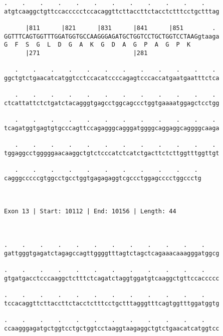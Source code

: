 \documentclass{article}
\begin{document}
\begin{Verbatim}
.    .    .    .    .    .    .    .    .    .    .    .    
atgtcaaggctgttccaccccctccacaggttcttaccttctacctctttcctgctttag
                                                            
      |811      |821      |831      |841      |851        . 
GGTTTCAGTGGTTTGGATGGTGCCAAGGGAGATGCTGGTCCTGCTGGTCCTAAGgtaaga
G  F  S  G  L  D  G  A  K  G  D  A  G  P  A  G  P  K        
      |271                          |281                    
  
   .    .    .    .    .    .    .    .    .    .    .    . 
ggctgtctgaacatcatggtcctccacatccccagagtcccaccatgaatgaatttctca
                                                            
   .    .    .    .    .    .    .    .    .    .    .    . 
ctcattattctctgatctacagggtgagcctggcagccctggtgaaaatggagctcctgg
                                                            
   .    .    .    .    .    .    .    .    .    .    .    . 
tcagatggtgagtgtgcccagttccagagggcagggatggggcaggaggcaggggcaaga
                                                            
   .    .    .    .    .    .    .    .    .    .    .    . 
tggaggcctgggggaacaaggctgtctcccatctcatctgacttctcttggtttggttgt
                                                            
   .    .    .    .    .    .    .    .    .    .    . 
cagggcccccgtggcctgcctggtgagagaggtcgccctggagcccctggccctg
                                                       
                                                       
 
Exon 13 | Start: 10112 | End: 10156 | Length: 44



.    .    .    .    .    .    .    .    .    .    .    .    
gattgggtgagatctagagccagttggggtttagtctagctcagaaacaaagggatggcg
                                                            
.    .    .    .    .    .    .    .    .    .    .    .    
gtgatgacctcccaaggctctttctcagatctaggtggatgtcaaggctgttccaccccc
                                                            
.    .    .    .    .    .    .    .    .    .    .    .    
tccacaggttcttaccttctacctctttcctgctttagggtttcagtggtttggatggtg
                                                            
.    .    .    .    .    .    .    .    .    .    .    .    
ccaagggagatgctggtcctgctggtcctaaggtaagaggctgtctgaacatcatggtcc
                                                            

\end{Verbatim}
\end{document}
